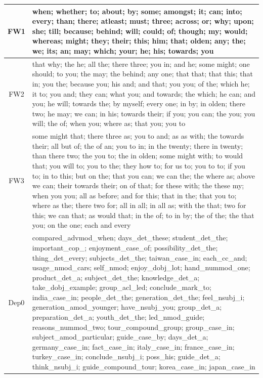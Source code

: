 \documentclass[11pt,letterpaper]{article}
\begin{document}
\begin{table}[t]
\begin{tabular}{|c|p{138mm}|}
\hline
FW1 & when; whether; to; about; by; some; amongst; it; can; into; every; than; there; atleast; must; three; across; or; why; upon; she; till; because; behind; will; could; of; though; my; would; whereas; might; they; their; this; him; that; olden; any; the; we; its; an; may; which; your; he; his; towards; you \\
\hline
FW2 & that why; the he; all the; there three; you in; and he; some might; one should; to you; the may; the behind; any one; that that; that this; that in; you the; because you; his and; and that; you you; of the; which he; it to; you and; they can; what you; and towards; the which; he can; and you; he will; towards the; by myself; every one; in by; in olden; there two; he may; we can; in his; towards their; if you; you can; the you; you will; the of; when you; where as; that you; you to \\
\hline
FW3 & some might that; there three as; you to and; as as with; the towards their; all but of; the of an; you to in; in the twenty; there in twenty; than there two; the you to; the in olden; some might with; to would that; you will to; you to the; they how to; for us to; you to to; if you to; in to this; but on the; that you can; we can the; the where as; above we can; their towards their; on of that; for these with; the these my; when you you; all as before; and for this; that in the; that you to; where as the; there two for; all in all; in all as; with the that; two for this; we can that; as would that; in the of; to in by; the of the; the that you; on the one; each and every \\
\hline
Dep0 & compared\_advmod\_when; days\_det\_these; student\_det\_the; important\_cop\_; enjoyment\_case\_of; possibility\_det\_the; thing\_det\_every; subjects\_det\_the; taiwan\_case\_in; each\_cc\_and; usage\_nmod\_cars; self\_nmod; enjoy\_dobj\_lot; hand\_nummod\_one; product\_det\_a; subject\_det\_the; knowledge\_det\_a; take\_dobj\_example; group\_acl\_led; conclude\_mark\_to; india\_case\_in; people\_det\_the; generation\_det\_the; feel\_nsubj\_i; generation\_amod\_younger; have\_nsubj\_you; group\_det\_a; preparation\_det\_a; youth\_det\_the; led\_nmod\_guide; reasons\_nummod\_two; tour\_compound\_group; group\_case\_in; subject\_amod\_particular; guide\_case\_by; days\_det\_a; germany\_case\_in; fact\_case\_in; italy\_case\_in; france\_case\_in; turkey\_case\_in; conclude\_nsubj\_i; poss\_his; guide\_det\_a; think\_nsubj\_i; guide\_compound\_tour; korea\_case\_in; japan\_case\_in \\
\hline

\end{tabular}
\end{table}
\end{document}
